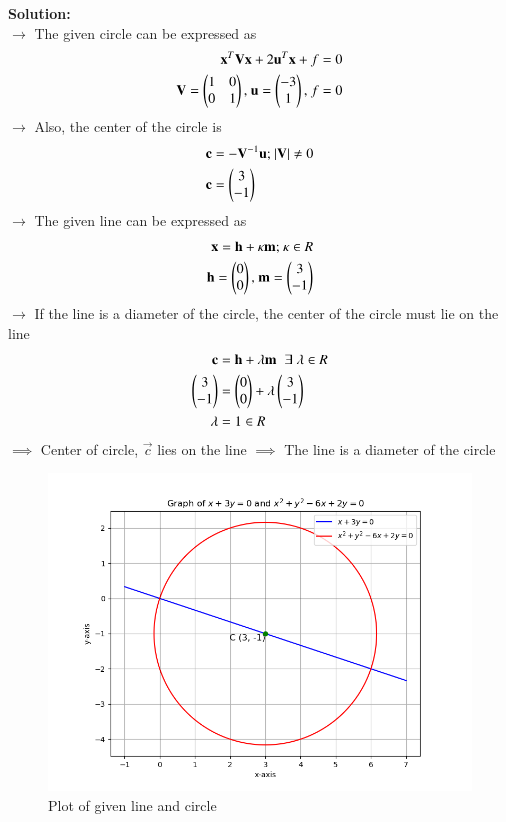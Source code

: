 \documentclass[journal]{IEEEtran}
\begin{document}
\textbf{Solution:}\\
$\rightarrow$ The given circle can be expressed as
\begin{align}
    \mathbf{x}^T\mathbf{V}\mathbf{x} + 2\mathbf{u}^T\mathbf{x} + f = 0 \\
    \mathbf{V} = \begin{pmatrix}1&0\\0&1\end{pmatrix}\text{, } \mathbf{u} = \begin{pmatrix}-3\\1\end{pmatrix}\text{, } f = 0
\end{align}
$\rightarrow$ Also, the center of the circle is
\begin{align}
    \mathbf{c} &= -\mathbf{V}^{-1}\mathbf{u}\text{; } |\mathbf{V}| \neq 0 \\
    \mathbf{c} &= \begin{pmatrix}3\\-1\end{pmatrix}
\end{align}
$\rightarrow$ The given line can be expressed as
\begin{align}
    \mathbf{x} = \mathbf{h} + \kappa\mathbf{m}\text{; } \kappa \in R\\
    \mathbf{h} = \begin{pmatrix}0\\0\end{pmatrix}\text{, } \mathbf{m} = \begin{pmatrix}3\\-1\end{pmatrix}
\end{align}
$\rightarrow$ If the line is a diameter of the circle, the center of the circle must lie on the line
\begin{align}
    \mathbf{c} &= \mathbf{h} + \lambda \mathbf{m} \hspace{0.2cm} \exists \hspace{0.1cm} \lambda \in R \\
    \begin{pmatrix}3\\-1\end{pmatrix} &= \begin{pmatrix}0\\0\end{pmatrix} + \lambda \begin{pmatrix}3\\-1\end{pmatrix} \\
    \lambda &= 1 \in R
\end{align}
$\implies$ Center of circle, $\vec{c}$ lies on the line
$\implies$ The line is a diameter of the circle
\begin{figure}[h!]
   \centering
   \includegraphics[width=0.8\linewidth]{figs/01.png}
   \caption{Plot of given line and circle}
   \label{Plot_1}
\end{figure}
\end{document}
